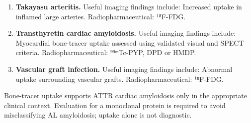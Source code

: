 \begin{enumerate}[leftmargin=*,itemsep=0.45em,topsep=0.4em]
\item \textbf{Takayasu arteritis.} Useful imaging findings include: Increased uptake in inflamed large arteries. Radiopharmaceutical: ¹⁸F-FDG.
\item \textbf{Transthyretin cardiac amyloidosis.} Useful imaging findings include: Myocardial bone-tracer uptake assessed using validated visual and SPECT criteria. Radiopharmaceutical: ⁹⁹ᵐTc-PYP, DPD or HMDP.
\item \textbf{Vascular graft infection.} Useful imaging findings include: Abnormal uptake surrounding vascular grafts. Radiopharmaceutical: ¹⁸F-FDG.
\end{enumerate}
Bone-tracer uptake supports ATTR cardiac amyloidosis only in the appropriate clinical context. Evaluation for a monoclonal protein is required to avoid misclassifying AL amyloidosis; uptake alone is not diagnostic.

